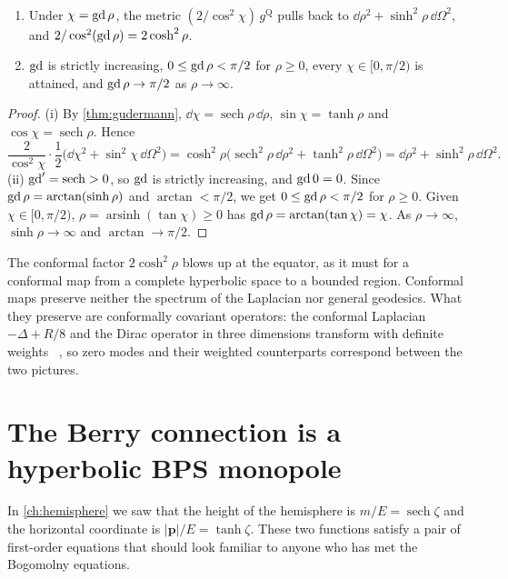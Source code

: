 \begin{proposition}\label{prop:qconformal}\ver\
\begin{enumerate}[label=(\roman*)]
\item Under $\chi=\operatorname{gd}\rho$, the metric $(2/\cos^2\chi)\,g^{\mathrm Q}$ pulls back to $\dd\rho^2+\sinh^2\rho\,\dd\Omega^2$, and $2/\cos^2(\operatorname{gd}\rho)=2\cosh^2\rho$.
\item $\operatorname{gd}$ is strictly increasing, $0\le\operatorname{gd}\rho<\pi/2$ for $\rho\ge0$, every $\chi\in[0,\pi/2)$ is attained, and $\operatorname{gd}\rho\to\pi/2$ as $\rho\to\infty$.
\end{enumerate}
\end{proposition}
\begin{proof}
(i) By \cref{thm:gudermann}, $\dd\chi=\operatorname{sech}\rho\,\dd\rho$, $\sin\chi=\tanh\rho$ and $\cos\chi=\operatorname{sech}\rho$. Hence
\[
\frac2{\cos^2\chi}\cdot\frac12\bigl(\dd\chi^2+\sin^2\chi\,\dd\Omega^2\bigr)=\cosh^2\rho\bigl(\operatorname{sech}^2\rho\,\dd\rho^2+\tanh^2\rho\,\dd\Omega^2\bigr)=\dd\rho^2+\sinh^2\rho\,\dd\Omega^2 .
\]
(ii) $\operatorname{gd}'=\operatorname{sech}>0$, so $\operatorname{gd}$ is strictly increasing, and $\operatorname{gd}0=0$. Since $\operatorname{gd}\rho=\arctan(\sinh\rho)$ and $\arctan<\pi/2$, we get $0\le\operatorname{gd}\rho<\pi/2$ for $\rho\ge0$. Given $\chi\in[0,\pi/2)$, $\rho=\operatorname{arsinh}(\tan\chi)\ge0$ has $\operatorname{gd}\rho=\arctan(\tan\chi)=\chi$. As $\rho\to\infty$, $\sinh\rho\to\infty$ and $\arctan\to\pi/2$.
\end{proof}


The conformal factor $2\cosh^2\rho$ blows up at the equator, as it must for a conformal map from a complete hyperbolic space to a bounded region. Conformal maps preserve neither the spectrum of the Laplacian nor general geodesics. What they preserve are conformally covariant operators: the conformal Laplacian $-\Delta+R/8$ and the Dirac operator in three dimensions transform with definite weights \ext\ \cite{Hitchin1974}, so zero modes and their weighted counterparts correspond between the two pictures.

\section{The Berry connection is a hyperbolic BPS monopole}

In \cref{ch:hemisphere} we saw that the height of the hemisphere is $m/E=\operatorname{sech}\zeta$ and the horizontal coordinate is $|\mathbf p|/E=\tanh\zeta$. These two functions satisfy a pair of first-order equations that should look familiar to anyone who has met the Bogomolny equations.

